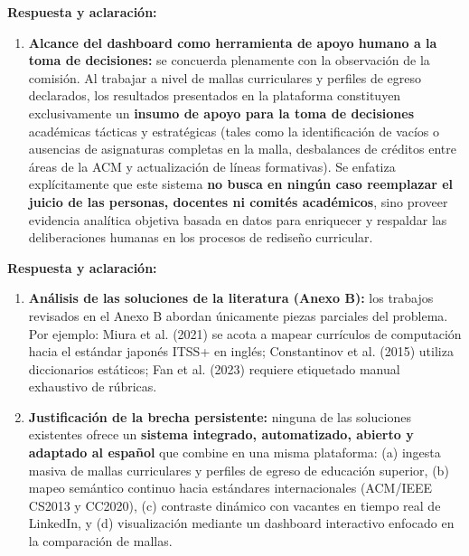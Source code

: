 \vspace{0.2cm}

\noindent
\textbf{Respuesta y aclaración:}
\begin{enumerate}[leftmargin=*]
	\item \textbf{Alcance del dashboard como herramienta de apoyo humano a la toma de decisiones:} se concuerda plenamente con la observación de la comisión. Al trabajar a nivel de mallas curriculares y perfiles de egreso declarados, los resultados presentados en la plataforma constituyen exclusivamente un \textbf{insumo de apoyo para la toma de decisiones} académicas tácticas y estratégicas (tales como la identificación de vacíos o ausencias de asignaturas completas en la malla, desbalances de créditos entre áreas de la ACM y actualización de líneas formativas). Se enfatiza explícitamente que este sistema \textbf{no busca en ningún caso reemplazar el juicio de las personas, docentes ni comités académicos}, sino proveer evidencia analítica objetiva basada en datos para enriquecer y respaldar las deliberaciones humanas en los procesos de rediseño curricular.
\end{enumerate}

\vspace{0.4cm}

\noindent
{}

\vspace{0.2cm}

\noindent
\textbf{Respuesta y aclaración:}
\begin{enumerate}[leftmargin=*]
	\item \textbf{Análisis de las soluciones de la literatura (Anexo B):} los trabajos revisados en el Anexo B abordan únicamente piezas parciales del problema. Por ejemplo: Miura et al. (2021) se acota a mapear currículos de computación hacia el estándar japonés ITSS+ en inglés; Constantinov et al. (2015) utiliza diccionarios estáticos; Fan et al. (2023) requiere etiquetado manual exhaustivo de rúbricas.
	\item \textbf{Justificación de la brecha persistente:} ninguna de las soluciones existentes ofrece un \textbf{sistema integrado, automatizado, abierto y adaptado al español} que combine en una misma plataforma: (a) ingesta masiva de mallas curriculares y perfiles de egreso de educación superior, (b) mapeo semántico continuo hacia estándares internacionales (ACM/IEEE CS2013 y CC2020), (c) contraste dinámico con vacantes en tiempo real de LinkedIn, y (d) visualización mediante un dashboard interactivo enfocado en la comparación de mallas.
\end{enumerate}

